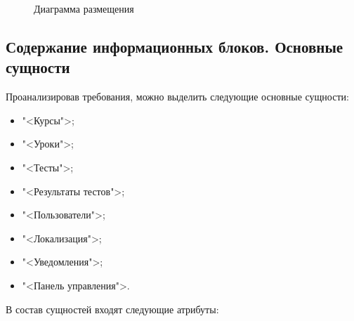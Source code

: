 \clearpage
\begin{figure}[htp!]
	\caption{Диаграмма размещения}
	\label{system:image}
\end{figure}


\subsection{Содержание информационных блоков. Основные сущности}

Проанализировав требования, можно выделить следующие основные сущности:

\begin{itemize}
  \item "<Курсы">;
  \item "<Уроки">;
  \item "<Тесты">;
  \item "<Результаты тестов">;
  \item "<Пользователи">;
  \item "<Локализация">;
  \item "<Уведомления">;
  \item "<Панель управления">.
\end{itemize}

В состав сущностей входят следующие атрибуты:

